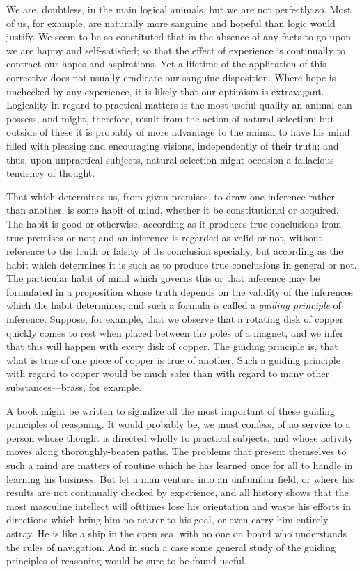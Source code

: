 We are, doubtless, in the main logical animals, but we are not
perfectly so. Most of us, for example, are naturally more sanguine and
hopeful than logic would justify. We seem to be so constituted that in
the absence of any facts to go upon we are happy and self-satisfied;
so that the effect of experience is continually to contract our hopes
and aspirations. Yet a lifetime of the application of this corrective
does not usually eradicate our sanguine disposition. Where hope is
unchecked by any experience, it is likely that our optimism is
extravagant. Logicality in regard to practical matters is the most
useful quality an animal can possess, and might, therefore, result
from the action of natural selection; but outside of these it is
probably of more advantage to the animal to have his mind filled
with pleasing and encouraging visions, independently of their truth;
and thus, upon unpractical subjects, natural selection might occasion
a fallacious tendency of thought.

That which determines us, from given premises, to draw one
inference rather than another, is some habit of mind, whether it be
constitutional or acquired. The habit is good or otherwise, according
as it produces true conclusions from true premises or not; and an
inference is regarded as valid or not, without reference to the truth
or falsity of its conclusion specially, but according as the habit
which determines it is such as to produce true conclusions in general
or not. The particular habit of mind which governs this or that
inference may be formulated in a proposition whose truth depends on
the validity of the inferences which the habit determines; and such a
formula is called a \textit{guiding principle} of inference. Suppose,
for example, that we observe that a rotating disk of copper quickly
comes to rest when placed between the poles of a magnet, and we infer
that this will happen with every disk of copper. The guiding principle
is, that what is true of one piece of copper is true of another. Such
a guiding principle with regard to copper would be much safer than
with regard to many other sub\-stanc\-es---brass, for example.

A book might be written to signalize all the most important of these
guiding principles of reasoning. It would probably be, we must
confess, of no service to a person whose thought is directed wholly to
practical subjects, and whose activity moves along thoroughly-beaten
paths. The problems that present themselves to such a mind are matters
of routine which he has learned once for all to handle in learning his
business. But let a man venture into an unfamiliar field, or where his
results are not continually checked by experience, and all history
shows that the most masculine intellect will ofttimes lose his
orientation and waste his efforts in directions which bring him no
nearer to his goal, or even carry him entirely astray. He is like a
ship in the open sea, with no one on board who understands the rules
of navigation. And in such a case some general study of the guiding
principles of reasoning would be sure to be found useful.

